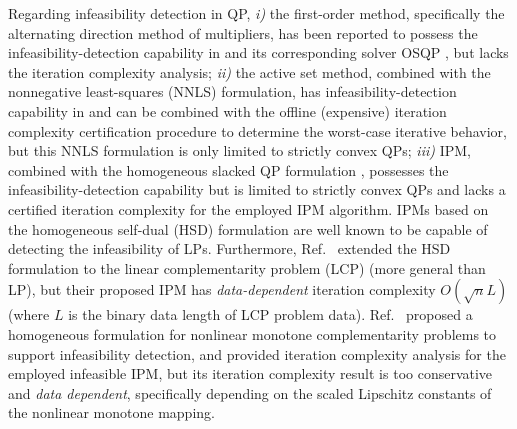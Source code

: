 Regarding infeasibility detection in QP, \textit{i)} the first-order method, specifically the alternating direction method of multipliers, has been reported to possess the infeasibility-detection capability in \cite{banjac2019infeasibility} and its corresponding solver OSQP \cite{stellato2020osqp}, but lacks the iteration complexity analysis; \textit{ii)} the active set method, combined with the nonnegative least-squares (NNLS) formulation, has infeasibility-detection capability in \cite{bemporad2015quadratic} and can be combined with the offline (expensive) iteration complexity certification procedure \cite{ arnstrom2020exact} to determine the worst-case iterative behavior, but this NNLS formulation is only limited to strictly convex QPs; \textit{iii)} IPM, combined with the homogeneous slacked QP formulation \cite{raghunathan2021homogeneous}, possesses the infeasibility-detection capability but is limited to strictly convex QPs and lacks a certified iteration complexity for the employed IPM algorithm. IPMs based on the homogeneous self-dual (HSD) formulation \cite{ye1994nl, xu1996simplified} are well known to be capable of detecting the infeasibility of LPs. Furthermore, Ref.\ \cite{ye1997homogeneous} extended the HSD formulation to the linear complementarity problem (LCP) (more general than LP), but their proposed IPM has \textit{data-dependent} iteration complexity $O(\sqrt{n}L)$ (where $L$ is the binary data length of LCP problem data). Ref.\ \cite{andersen1999homogeneous} proposed a homogeneous formulation for nonlinear monotone complementarity problems to support infeasibility detection, and provided iteration complexity analysis for the employed infeasible IPM, but its iteration complexity result is too conservative and  \textit{data dependent}, specifically depending on the scaled Lipschitz constants of the nonlinear monotone mapping.